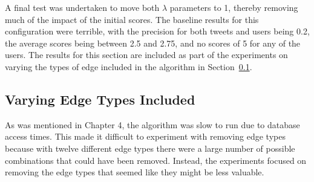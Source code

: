






A final test was undertaken to move both $\lambda$ parameters to 1, thereby removing much of the impact of the initial scores. The baseline results for this configuration were terrible, with the precision for both tweets and users being 0.2, the average scores being between 2.5 and 2.75, and no scores of 5 for any of the users. The results for this section are included as part of the experiments on varying the types of edge included in the algorithm in Section~\ref{sec:VaryingEdgeTypes}.




\subsection{Varying Edge Types Included}
\label{sec:VaryingEdgeTypes}

As was mentioned in Chapter 4, the algorithm was slow to run due to database access times. This made it difficult to experiment with removing edge types because with twelve different edge types there were a large number of possible combinations that could have been removed. Instead, the experiments focused on removing the edge types that seemed like they might be less valuable.

